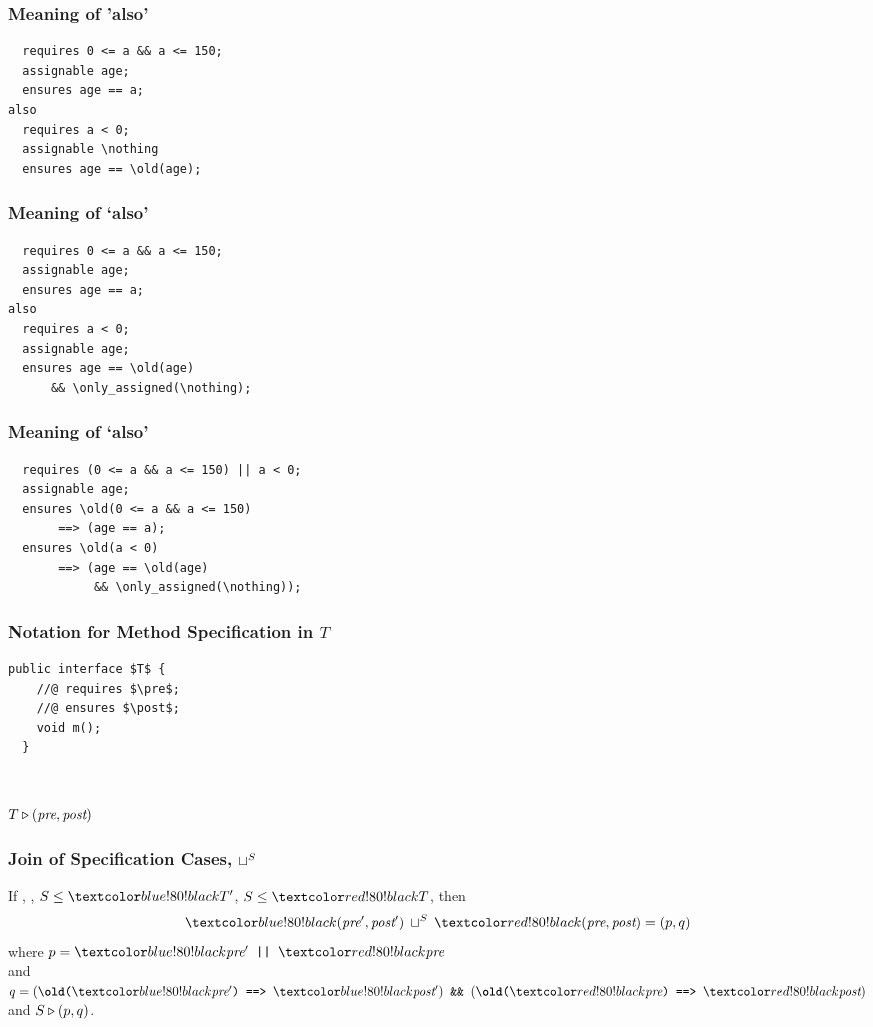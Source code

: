 \begin{frame}[fragile]
\frametitle{Meaning of 'also'}
\begin{lstlisting}
  requires 0 <= a && a <= 150;
  assignable age;
  ensures age == a;
also
  requires a < 0;
  assignable \nothing
  ensures age == \old(age);
\end{lstlisting}
\end{frame}

\begin{frame}[fragile]
\frametitle{Meaning of `also'}
\begin{lstlisting}
  requires 0 <= a && a <= 150;
  assignable age;
  ensures age == a;
also
  requires a < 0;
  assignable age;
  ensures age == \old(age)
      && \only_assigned(\nothing);
\end{lstlisting}
\end{frame}

\begin{frame}[fragile]
\frametitle{Meaning of `also'}

\begin{lstlisting}
  requires (0 <= a && a <= 150) || a < 0;
  assignable age;
  ensures \old(0 <= a && a <= 150)
       ==> (age == a);
  ensures \old(a < 0)
       ==> (age == \old(age)
            && \only_assigned(\nothing));
\end{lstlisting}
\end{frame}

\begin{frame}[fragile]
\frametitle{Notation for Method Specification in $T$}

\begin{lstlisting}[mathescape=true]
  public interface $T$ {
    //@ requires $\pre$;
    //@ ensures $\post$;
    void m();
  }
\end{lstlisting}

~

$T \triangleright ({\textit{pre}}, {\textit{post}})$
\end{frame}


\begin{frame}
\frametitle{Join of Specification Cases, $\sqcup^{S}$}
\begin{definition}
If , ,
$S \STO \BLUE{T'}$, $S \STO \RED{T}$, 
then
\begin{displaymath}
\BLUE{(\pre',\post')} \:\join^S\: \RED{(\pre,\post)} = (p,q)
\end{displaymath}
where $p = \BLUE{\pre'} \mbox{\texttt{ || }} \RED{\pre}$ \\
and $q = (\texttt{\textbackslash\textbf{old}(}\BLUE{\pre'}\texttt{)}
   \mbox{\texttt{ ==> }} \BLUE{\post'})
\mbox{\texttt{ \&\& }}
  (\texttt{\textbackslash\textbf{old}(}\RED{\pre}\texttt{)}
   \mbox{\texttt{ ==> }} \RED{\post})$ \\
and $S \triangleright (p, q)$.
\end{definition}
\end{frame}


